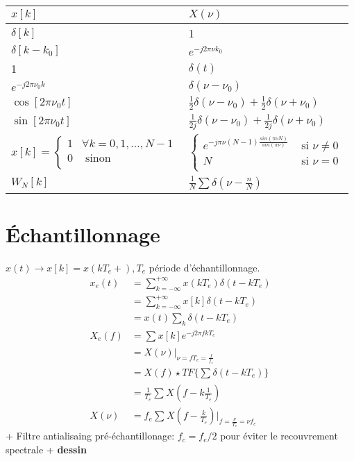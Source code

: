 \documentclass{article}
\theoremstyle{plain}%
\theoremstyle{definition}
\theoremstyle{remark}
\begin{document}
\begin{table}[!ht]
    \centering
    \begin{tabular}{|l|l|}
    \hline
        $x[k]$ & $X(\nu)$ \\ \hline
        $\delta[k]$ & 1 \\ \hline
        $\delta[k - k_0]$ & $e^{-j 2 \pi \nu k_0}$ \\ \hline
        1 & $\delta(t)$ \\ \hline
        $e^{-j 2 \pi \nu_0 k}$ & $\delta(\nu - \nu_0)$ \\ \hline
        $\cos [2 \pi \nu_0t]$ & $\frac{1}{2}\delta(\nu -\nu_0) + \frac{1}{2}\delta (\nu +\nu_0)$ \\ \hline
        $\sin [2 \pi \nu_0t]$ & $\frac{1}{2j}\delta(\nu -\nu_0) + \frac{1}{2j}\delta (\nu +\nu_0)$ \\ \hline
        $x[k] = \begin{cases}
            1 & \forall k = 0, 1, \dots, N-1\\
            0 &\text{ sinon}\\
        \end{cases} $ & $\begin{cases}
        e^{-j \pi \nu (N-1) \frac{sin(\pi \nu N)}{sin(\pi \nu )}} &\text{ si } \nu \neq 0\\
        N                                                          &\text{ si } \nu  = 0\\
        \end{cases} $ \\ \hline
        $W_N[k]$ & $\frac{1}{N} \sum \delta(\nu - \frac{n}{N})$ \\ \hline
    \end{tabular}
\end{table}



\section{Échantillonnage}
$ x(t) \to x[k] = x(kT_e+), T_e $  période d'échantillonnage. \\
\begin{align*}
    x_e(t)  &= \sum_{k=-\infty }^{+\infty }x(kT_e)\delta (t - kT_e) \\
            &= \sum_{k=-\infty }^{+\infty }x[k]\delta (t - kT_e) \\
            &= x(t) \sum_{k}^{}\delta (t - kT_e)\\
    X_e(f)  &= \sum_{}^{} x[k] e^{- j 2 \pi fkT_e} \\
            &= X(\nu ) \vert _{\nu = fT_e = \frac{f}{f_e}} \\
            &= X(f) \star TF\{\sum_{}^{} \delta (t - kT_e)\} \\
            &= \frac{1}{T_e} \sum_{}^{}X(f - k \frac{1}{T_e}) \\
    X(\nu ) &= f_e \sum_{}^{}X(f - \frac{k}{T_e}) \vert _{f = \frac{\nu}{T_e} = \nu f_e}
\end{align*}
+ Filtre antialisaing pré-échantillonage: $ f_c = f_e / 2 $ pour éviter le recouvrement spectrale + \textbf{dessin}
\end{document}
